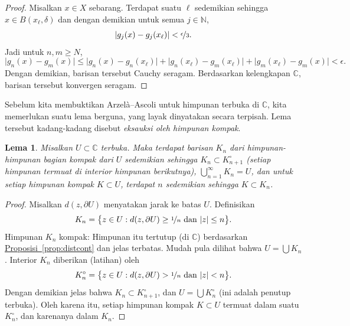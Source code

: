 \documentclass[12pt,openany]{book}
\newcommand{\sabs}[1]{\lvert {#1} \rvert}
\newcommand{\C}{{\mathbb{C}}}
\newcommand{\N}{{\mathbb{N}}}
\newcommand{\myindex}[1]{#1\index{#1}}
\theoremstyle{plain}
\newtheorem{lemma}[thm]{Lema}
\theoremstyle{remark}
\theoremstyle{definition}
\theoremstyle{exercise}
\theoremstyle{example}
\newcommand{\propref}[1]{\hyperref[#1]{Proposisi~\ref*{#1}}}
\begin{document}
\begin{proof}
Misalkan $x \in X$ sebarang.  Terdapat suatu $\ell$ sedemikian sehingga
$x \in B(x_\ell,\delta)$ dan dengan demikian untuk semua $j \in \N$,
\begin{equation*}
\sabs{g_j(x)-g_j(x_\ell)} < \nicefrac{\epsilon}{3}.
\end{equation*}
Jadi untuk $n,m \geq N$,
\begin{equation*}
\sabs{g_n(x)-g_m(x)} \leq
\sabs{g_n(x)-g_n(x_\ell)} +
\sabs{g_n(x_\ell)-g_m(x_\ell)} +
\sabs{g_m(x_\ell)-g_m(x)} <
\epsilon .
\end{equation*}
Dengan demikian, barisan tersebut Cauchy seragam.  Berdasarkan kelengkapan $\C$,
barisan tersebut konvergen seragam.
\end{proof}

Sebelum kita membuktikan 
Arzel\`a--Ascoli untuk himpunan terbuka di $\C$, kita memerlukan suatu
lema berguna, yang layak dinyatakan secara terpisah.
Lema tersebut kadang-kadang disebut \emph{\myindex{eksauksi oleh himpunan kompak}}.

\begin{lemma}\label{lemma:compactexhaustion}
Misalkan $U \subset \C$ terbuka.  Maka terdapat barisan $K_n$
dari himpunan-himpunan bagian kompak dari $U$ sedemikian sehingga $K_n \subset K^\circ_{n+1}$ (setiap himpunan
termuat di interior himpunan berikutnya), $\bigcup_{n=1}^\infty K_n = U$, dan
untuk setiap himpunan kompak $K \subset U$, terdapat $n$ sedemikian sehingga $K \subset K_n$.
\end{lemma}

\begin{proof}
Misalkan $d(z,\partial U)$ menyatakan jarak ke batas $U$.  Definisikan
\begin{equation*}
K_n = \bigl\{
z \in U : d(z,\partial U) \geq \nicefrac{1}{n} \text{ dan } \sabs{z} \leq
n
\bigr\} .
\end{equation*}
Himpunan $K_n$ kompak: Himpunan itu tertutup (di $\C$) berdasarkan
\propref{prop:distcont} dan jelas terbatas.
Mudah pula dilihat bahwa $U = \bigcup K_n$.  Interior
$K_n$ diberikan (latihan) oleh
\begin{equation*}
K^\circ_n =
\bigl\{
z \in U : d(z,\partial U) > \nicefrac{1}{n} \text{ dan } \sabs{z} < n
\bigr\} .
\end{equation*}
Dengan demikian jelas bahwa $K_n \subset K^\circ_{n+1}$, dan
$U = \bigcup K^\circ_n$ (ini adalah penutup terbuka).
Oleh karena itu, setiap himpunan kompak $K \subset U$
termuat dalam suatu $K^\circ_n$, dan karenanya dalam $K_n$.
\end{proof}
\end{document}
